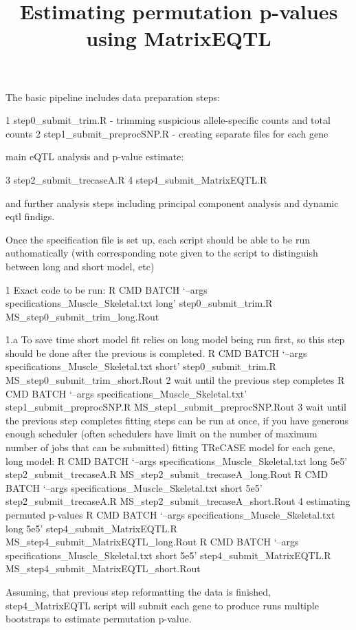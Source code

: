 \documentclass[]{article}
\title{Estimating permutation p-values using MatrixEQTL}
\author{}
\date{}
\begin{document}
\maketitle

The basic pipeline includes data preparation steps:

1 step0\_submit\_trim.R - trimming suspicious allele-specific counts and
total counts 2 step1\_submit\_preprocSNP.R - creating separate files for
each gene

main eQTL analysis and p-value estimate:

3 step2\_submit\_trecaseA.R 4 step4\_submit\_MatrixEQTL.R

and further analysis steps including principal component analysis and
dynamic eqtl findigs.

Once the specification file is set up, each script should be able to be
run authomatically (with corresponding note given to the script to
distinguish between long and short model, etc)

1 Exact code to be run: R CMD BATCH `--args
specifications\_Muscle\_Skeletal.txt long' step0\_submit\_trim.R
MS\_step0\_submit\_trim\_long.Rout

1.a To save time short model fit relies on long model being run first,
so this step should be done after the previous is completed. R CMD BATCH
`--args specifications\_Muscle\_Skeletal.txt short'
step0\_submit\_trim.R MS\_step0\_submit\_trim\_short.Rout 2 wait until
the previous step completes R CMD BATCH `--args
specifications\_Muscle\_Skeletal.txt' step1\_submit\_preprocSNP.R
MS\_step1\_submit\_preprocSNP.Rout 3 wait until the previous step
completes fitting steps can be run at once, if you have generous enough
scheduler (often schedulers have limit on the number of maximum number
of jobs that can be submitted) fitting TReCASE model for each gene, long
model: R CMD BATCH `--args specifications\_Muscle\_Skeletal.txt long
5e5' step2\_submit\_trecaseA.R MS\_step2\_submit\_trecaseA\_long.Rout R
CMD BATCH `--args specifications\_Muscle\_Skeletal.txt short 5e5'
step2\_submit\_trecaseA.R MS\_step2\_submit\_trecaseA\_short.Rout 4
estimating permuted p-values R CMD BATCH `--args
specifications\_Muscle\_Skeletal.txt long 5e5'
step4\_submit\_MatrixEQTL.R MS\_step4\_submit\_MatrixEQTL\_long.Rout R
CMD BATCH `--args specifications\_Muscle\_Skeletal.txt short 5e5'
step4\_submit\_MatrixEQTL.R MS\_step4\_submit\_MatrixEQTL\_short.Rout

Assuming, that previous step reformatting the data is finished,
step4\_MatrixEQTL script will submit each gene to produce runs multiple
bootstraps to estimate permutation p-value.
\end{document}
